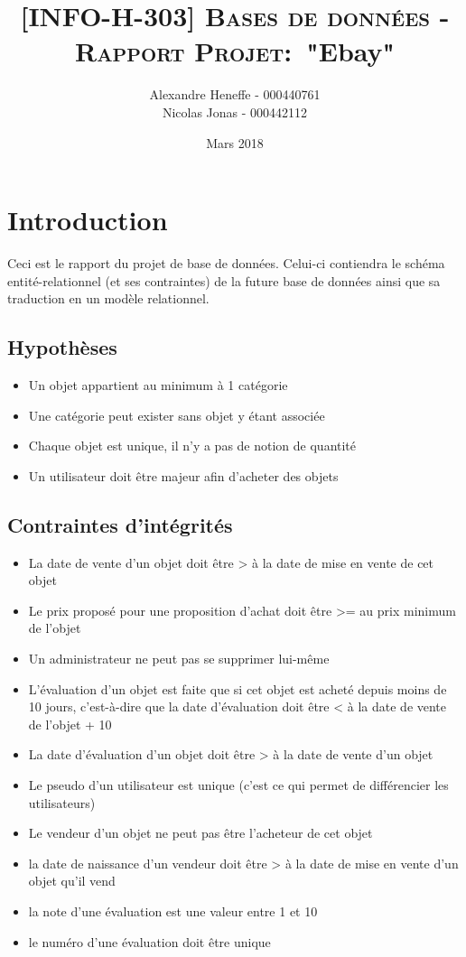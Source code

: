 \documentclass[a4paper,11pt]{article}
\title{\textsc{[INFO-H-303] Bases de données - Rapport Projet:}\
   "Ebay"}
\author{Alexandre Heneffe - 000440761\\
        Nicolas Jonas - 000442112}
\date{Mars 2018}
\begin{document}
\maketitle
\section{Introduction}

Ceci est le rapport du projet de base de données. Celui-ci contiendra le schéma entité-relationnel (et ses contraintes) de la future base de données ainsi que sa traduction en un modèle relationnel.

\subsection{Hypothèses}

\begin{itemize}[label=\textbullet]
	\item Un objet appartient au minimum à 1 catégorie
	\item Une catégorie peut exister sans objet y étant associée
	\item Chaque objet est unique, il n'y a pas de notion de quantité
	\item Un utilisateur doit être majeur afin d'acheter des objets

\end{itemize}

\subsection{Contraintes d'intégrités}

\begin{itemize} [label=\textbullet]
	\item La date de vente d'un objet doit être > à la date de mise en vente de cet objet
	\item Le prix proposé pour une proposition d'achat doit être >= au prix minimum de l'objet
	\item Un administrateur ne peut pas se supprimer lui-même
	\item L'évaluation d'un objet est faite que si cet objet est acheté depuis moins de 10 jours, c'est-à-dire que la date d'évaluation doit être < à
	la date de vente de l'objet + 10
	\item La date d'évaluation d'un objet doit être > à la date de vente d'un objet
	\item Le pseudo d'un utilisateur est unique (c'est ce qui permet de différencier les utilisateurs)
	\item Le vendeur d'un objet ne peut pas être l'acheteur de cet objet
	\item la date de naissance d'un vendeur doit être > à la date de mise en vente d'un objet qu'il vend
	\item la note d'une évaluation est une valeur entre 1 et 10
	\item le numéro d'une évaluation doit être unique
	
\end{itemize}
\end{document}
